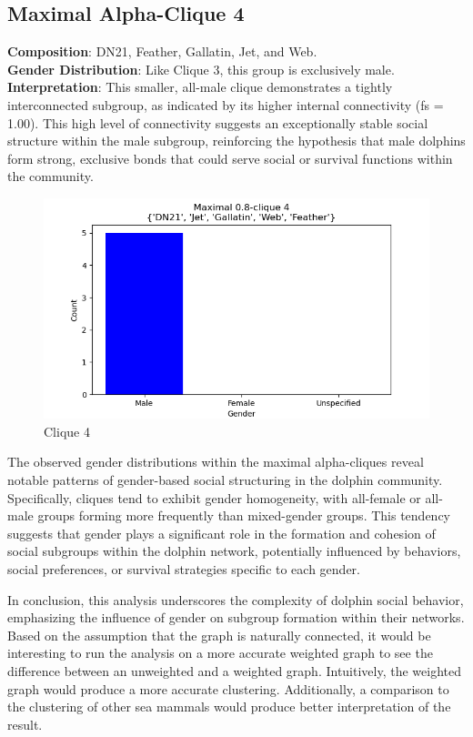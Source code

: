 \subsection{Maximal Alpha-Clique 4}
\textbf{Composition}: DN21, Feather, Gallatin, Jet, and Web. \\
\textbf{Gender Distribution}: Like Clique 3, this group is exclusively male. \\
\textbf{Interpretation}: This smaller, all-male clique demonstrates a tightly interconnected subgroup, as indicated by its higher internal connectivity (fs = 1.00). This high level of connectivity suggests an exceptionally stable social structure within the male subgroup, reinforcing the hypothesis that male dolphins form strong, exclusive bonds that could serve social or survival functions within the community.
\begin{figure}[H]
    \centering
    \includegraphics[width=1.0\textwidth]{imgs/clique_4.png}
    \caption{Clique 4}
    \label{fig:clique_4}
\end{figure}

The observed gender distributions within the maximal alpha-cliques reveal notable patterns of gender-based social structuring in the dolphin community. Specifically, cliques tend to exhibit gender homogeneity, with all-female or all-male groups forming more frequently than mixed-gender groups. This tendency suggests that gender plays a significant role in the formation and cohesion of social subgroups within the dolphin network, potentially influenced by behaviors, social preferences, or survival strategies specific to each gender.

In conclusion, this analysis underscores the complexity of dolphin social behavior, emphasizing the influence of gender on subgroup formation within their networks. Based on the assumption that the graph is naturally connected, it would be interesting to run the analysis on a more accurate weighted graph to see the difference between an unweighted and a weighted graph. Intuitively, the weighted graph would produce a more accurate clustering. Additionally, a comparison to the clustering of other sea mammals would produce better interpretation of the result.